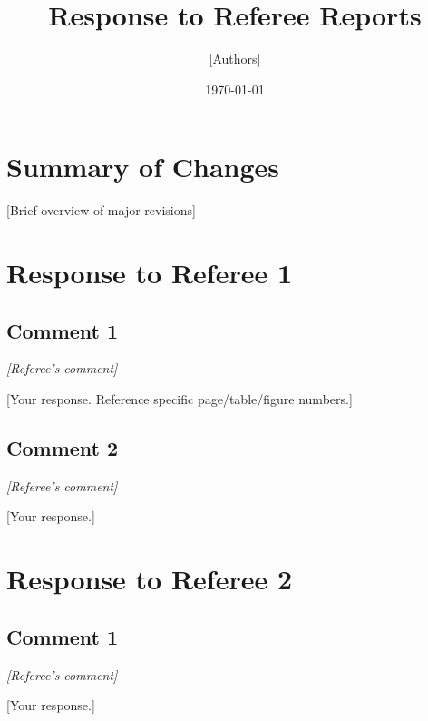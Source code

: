 \documentclass[12pt]{article}
\title{Response to Referee Reports}
\author{[Authors]}
\date{\today}
\newcommand{\refereecomment}[1]{\textcolor{refereecolor}{\textit{#1}}}
\newcommand{\response}[1]{\textcolor{responsecolor}{#1}}
\begin{document}
\maketitle

\section*{Summary of Changes}

[Brief overview of major revisions]

\section*{Response to Referee 1}

\subsection*{Comment 1}
\refereecomment{[Referee's comment]}

\response{[Your response. Reference specific page/table/figure numbers.]}

\subsection*{Comment 2}
\refereecomment{[Referee's comment]}

\response{[Your response.]}

\section*{Response to Referee 2}

\subsection*{Comment 1}
\refereecomment{[Referee's comment]}

\response{[Your response.]}
\end{document}
